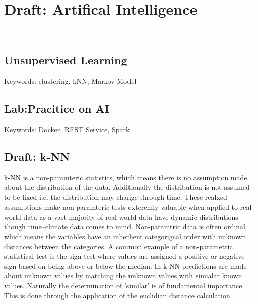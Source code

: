 \chapter{Draft: Artifical Intelligence}
\label{c:ai}

\FILENAME\

%
%

\section{Unsupervised Learning}

Keywords: clustering, kNN, Markov Model




\section{Lab:Pracitice on AI}
Keywords: Docker, REST Service, Spark


\section{Draft: k-NN}

k-NN is a non-paramteric statistics, which means there is no
assumption made about the distribution of the data. Additionally the
distribution is not assumed to be fixed i.e. the distribution may
change through time. These realxed assumptions make non-paramteric
tests exteremly valuable when applied to real-world data as a vast
majority of real world data have dynamic distributions though
time--climate data comes to mind. Non-paramtric data is often ordinal
which means the variables have an inherhent categorigcal order with
unknown distances between the categories. A common example of a
non-parametric statistical test is the sign test where values are
assigned a positive or negative sign based on being above or below the
median. In k-NN predictions are made about unknown values by matching
the unknown values with simialar known values. Naturally the
determination of 'similar' is of fundamental importance. This is done
through the application of the euclidian distance calculation. 

